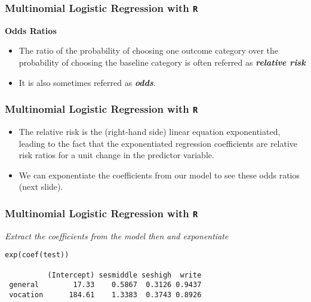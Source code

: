 \documentclass[00-GLMregslides.tex]{subfiles}
\begin{document}
	


\begin{frame}[fragile]

\frametitle{Multinomial Logistic Regression with \texttt{R}}
\Large
\vspace{-1cm}
\textbf{Odds Ratios}
\begin{itemize}
\item The ratio of the probability of choosing one outcome category over the probability of choosing the baseline category is often referred as 
\textbf{\textit{relative risk}} 
\item It is also sometimes referred as \textbf{\textit{odds}}.

\end{itemize}
\end{frame}
\begin{frame}[fragile]
\frametitle{Multinomial Logistic Regression with \texttt{R}}	\Large
	\begin{itemize}
\item  The relative risk is the (right-hand side) linear equation exponentiated, leading to the fact that the 
exponentiated regression coefficients are relative risk ratios for a unit change in the predictor variable. 
\smallskip
\item  We can exponentiate the coefficients from our model to see these odds ratios (next slide). 
\end{itemize}
\end{frame}
\begin{frame}[fragile]

\frametitle{Multinomial Logistic Regression with \texttt{R}}
\large

\textit{Extract the coefficients from the model then and exponentiate}
\begin{framed}
\begin{verbatim}
exp(coef(test))
 
          (Intercept) sesmiddle seshigh  write
 general        17.33    0.5867  0.3126 0.9437
 vocation      184.61    1.3383  0.3743 0.8926
\end{verbatim}
\end{framed}
\end{frame}
\end{document}
